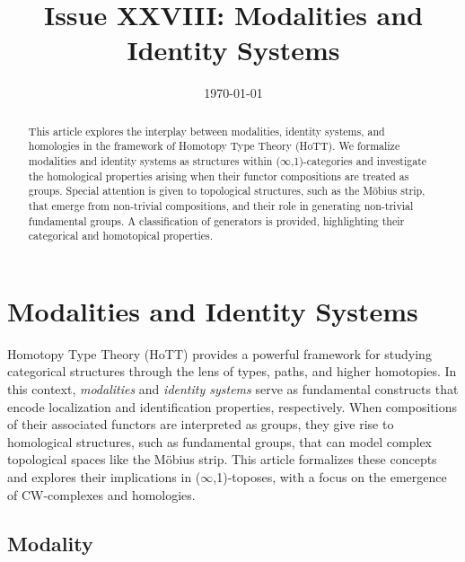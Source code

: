 \documentclass[12pt]{article}
\theoremstyle{definition}
\theoremstyle{plain}
\begin{document}
\title{Issue XXVIII: Modalities and Identity Systems}
\author{}
\date{\today}

\maketitle

\begin{abstract}
This article explores the interplay between modalities, identity systems, and homologies
in the framework of Homotopy Type Theory (HoTT). We formalize modalities and identity
systems as structures within ($\infty$,1)-categories and investigate the homological properties arising when their functor compositions are treated as groups. Special attention is given to topological structures, such as the Möbius strip, that emerge from non-trivial compositions, and their role in generating non-trivial fundamental groups. A classification of generators is provided, highlighting their categorical and homotopical properties.
\end{abstract}

\section{Modalities and Identity Systems}

Homotopy Type Theory (HoTT) provides a powerful framework for studying
categorical structures through the lens of types, paths, and higher
homotopies. In this context, \emph{modalities} and \emph{identity systems}
serve as fundamental constructs that encode localization and identification
properties, respectively. When compositions of their associated functors
are interpreted as groups, they give rise to homological structures, such
as fundamental groups, that can model complex topological spaces like the
Möbius strip. This article formalizes these concepts and explores their
implications in ($\infty$,1)-toposes, with a focus on the emergence of CW-complexes and homologies.

\subsection{Modality}
\end{document}
